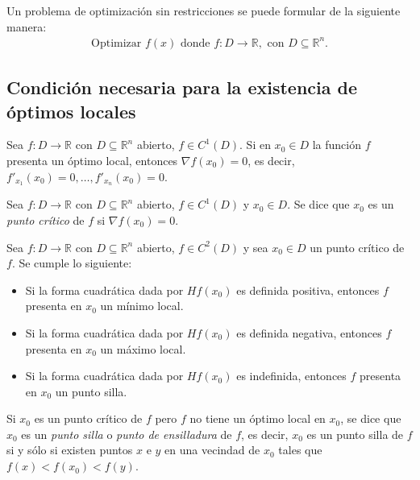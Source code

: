 Un problema de optimizaci\'on sin restricciones se puede formular de la siguiente manera:
\begin{eqnarray*}
\textrm{Optimizar } f(x) \textrm{ donde } f:D\to\mathbb{R}, \textrm{ con }D\subseteq\mathbb{R}^n.
\end{eqnarray*}


\subsection*{Condici\'on necesaria para la existencia de \'optimos locales}

\begin{Teo} Sea $f:D\to\mathbb{R}$ con $D\subseteq\mathbb{R}^n$ abierto, $f\in C^1(D)$. Si en $x_0\in D$ la funci\'on $f$ presenta un \'optimo local, entonces $\nabla f(x_0)=0$, es decir, $f'_{x_1}(x_0)=0,\ldots,f'_{x_n}(x_0)=0$.
\end{Teo}

\begin{Def} Sea $f:D\to\mathbb{R}$ con $D\subseteq\mathbb{R}^n$ abierto, $f\in C^1(D)$ y $x_0\in D$. Se dice que $x_0$ es un \textit{punto cr\'itico} de $f$ si $\nabla f(x_0)=0$.
\end{Def}


\begin{Teo} Sea $f:D\to\mathbb{R}$ con $D\subseteq\mathbb{R}^n$ abierto, $f\in C^2(D)$ y sea $x_0\in D$ un punto cr\'itico de $f$. Se cumple lo siguiente:

\begin{itemize}
\item[(i)] Si la forma cuadr\'atica dada por $Hf(x_0)$ es definida positiva, entonces $f$ presenta en $x_0$ un m\'inimo local.
\item[(ii)] Si la forma cuadr\'atica dada por $Hf(x_0)$ es definida negativa, entonces $f$ presenta en $x_0$ un m\'aximo local.
\item[(iii)] Si la forma cuadr\'atica dada por $Hf(x_0)$ es indefinida, entonces $f$ presenta en $x_0$ un punto silla.
\end{itemize}
\end{Teo}


\begin{Obs} Si $x_0$ es un punto cr\'itico de $f$ pero $f$ no tiene un \'optimo local en $x_0$, se dice que $x_0$ es un \textit{punto silla} o \textit{punto de ensilladura} de $f$, es decir, $x_0$ es un punto silla de $f$ si y s\'olo si existen puntos $x$ e $y$ en una vecindad de $x_0$ tales que  $f(x)<f(x_0)<f(y)$.
\end{Obs}

